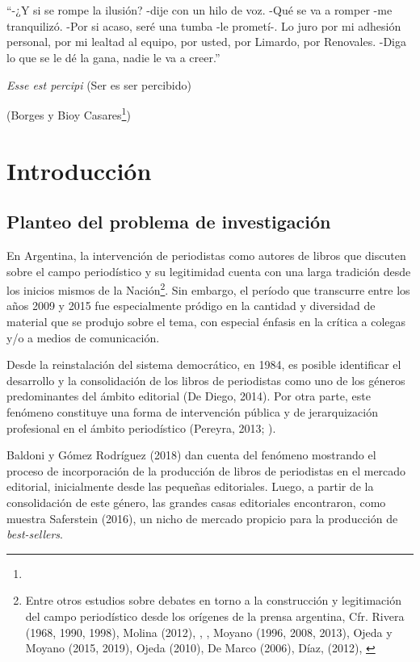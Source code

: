 \mainmatter

\chapter*{}
\epigraph{\enquote{-¿Y si se rompe la ilusión? -dije con un hilo de voz.
		-Qué se va a romper -me tranquilizó.
		-Por si acaso, seré una tumba -le prometí-.
		Lo juro por mi adhesión personal, por mi lealtad al equipo, por usted, por Limardo, por Renovales.
		-Diga lo que se le dé la gana, nadie le va a creer.}

	\emph{Esse est percipi} (Ser es ser percibido)}{(Borges y Bioy Casares\footnote{})}

\chapter {Introducción}
\section {Planteo del problema de investigación}
En Argentina, la intervención de periodistas como autores de libros que discuten sobre el campo periodístico y su legitimidad cuenta con una larga tradición desde los inicios mismos de la Nación\footnote{Entre otros estudios sobre debates en torno a la construcción y legitimación del campo periodístico desde los orígenes de la prensa argentina, Cfr. Rivera (1968, 1990, 1998), Molina (2012), \textcite{@6964-ALONSO1997}, \textcite{@6965-ALONSO2004}, Moyano (1996, 2008, 2013), Ojeda y Moyano (2015, 2019), Ojeda (2010), De Marco (2006), Díaz, (2012), \textcite{@6967-AUZA1978}}. Sin embargo, el período que transcurre entre los años 2009 y 2015 fue especialmente pródigo en la cantidad y diversidad de material que se produjo sobre el tema, con especial énfasis en la crítica a colegas y/o a medios de comunicación.

Desde la reinstalación del sistema democrático, en 1984, es posible identificar el desarrollo y la consolidación de los libros de periodistas como uno de los géneros predominantes del ámbito editorial (De Diego, 2014). Por otra parte, este fenómeno constituye una forma de intervención pública y de jerarquización profesional en el ámbito periodístico (Pereyra, 2013; \cite{@6977-VOMMARO2012}).

Baldoni y Gómez Rodríguez (2018) dan cuenta del fenómeno mostrando el proceso de incorporación de la producción de libros de periodistas en el mercado editorial, inicialmente desde las pequeñas editoriales. Luego, a partir de la consolidación de este género, las grandes casas editoriales encontraron, como muestra Saferstein (2016), un nicho de mercado propicio para la producción de \emph{best-sellers}.

